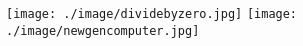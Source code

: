 \begin{figure}[H]
	\centering
	\begin{multicols}{2}
	\texttt{[image: ./image/dividebyzero.jpg]}
	\texttt{[image: ./image/newgencomputer.jpg]}
	\end{multicols}
\end{figure}
\newpage
\begin{comment}
\begin{figure}[H]
	\begin{subfigure}[h]{0.5\textwidth}
		\texttt{[image: ./image/dividebyzero.jpg]}
	\end{subfigure}
	\hspace{.5cm}
	\begin{subfigure}[h]{0.5\textwidth}
		\texttt{[image: ./image/newgencomputer.jpg]}
	\end{subfigure}
\end{figure}
\end{comment}
